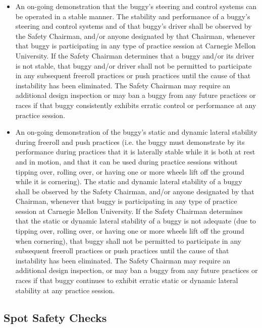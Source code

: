 \begin{itemize}
		\item
		An on-going demonstration that the buggy's steering and control systems can be operated in a stable manner. The stability and performance of a buggy's steering and control systems and of that buggy's driver shall be observed by the Safety Chairman, and/or anyone designated by that Chairman, whenever that buggy is participating in any type of practice session at Carnegie Mellon University. If the Safety Chairman determines that a buggy and/or its driver is not stable, that buggy and/or driver shall not be permitted to participate in any subsequent freeroll practices or push practices until the cause of that instability has been eliminated. The Safety Chairman may require an additional design inspection or may ban a buggy from any future practices or races if that buggy consistently exhibits erratic control or performance at any practice session.

		\item
		An on-going demonstration of the buggy's static and dynamic lateral stability during freeroll and push practices (i.e. the buggy must demonstrate by its performance during practices that it is laterally stable while it is both at rest and in motion, and that it can be used during practice sessions without tipping over, rolling over, or having one or more wheels lift off the ground while it is cornering). The static and dynamic lateral stability of a buggy shall be observed by the Safety Chairman, and/or anyone designated by that Chairman, whenever that buggy is participating in any type of practice session at Carnegie Mellon University. If the Safety Chairman determines that the static or dynamic lateral stability of a buggy is not adequate (due to tipping over, rolling over, or having one or more wheels lift off the ground when cornering), that buggy shall not be permitted to participate in any subsequent freeroll practices or push practices until the cause of that instability has been eliminated. The Safety Chairman may require an additional design inspection, or may ban a buggy from any future practices or races if that buggy continues to exhibit erratic static or dynamic lateral stability at any practice session.

	\end{itemize}

\subsection{Spot Safety Checks}
\label{subsec:Spot Safety}

